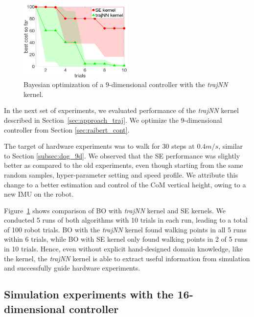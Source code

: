 \begin{figure}
    \centering
    \includegraphics[width = 0.5\textwidth]{img/9d_hdw_nn.png}
    \caption{Bayesian optimization of a 9-dimensional controller with the \textit{trajNN} kernel.}
    \label{fig:9d_hdw_nn}
\end{figure}
In the next set of experiments, we evaluated performance of the \textit{trajNN} kernel described in Section~\ref{sec:approach_traj}. We optimize the 9-dimensional controller from Section \ref{sec:raibert_cont}. 

The target of hardware experiments was to walk for 30 steps at $0.4m/s$, similar to Section \ref{subsec:dog_9d}. We observed that the SE performance was slightly better as compared to the old experiments, even though starting from the same random samples, hyper-parameter setting and speed profile. We attribute this change to a better estimation and control of the CoM vertical height, owing to a new IMU on the robot. 


Figure~\ref{fig:9d_hdw_nn} shows comparison of BO with \textit{trajNN} kernel and SE kernels. We conducted 5 runs of both algorithms with 10 trials in each run, leading to a total of 100 robot trials. BO with the \textit{trajNN} kernel found walking points in all 5 runs within 6 trials, while BO with SE kernel only found walking points in 2 of 5 runs in 10 trials.
Hence, even without explicit hand-designed domain knowledge, like the \dogkernel kernel, the \textit{trajNN} kernel is able to extract useful information from simulation and successfully guide hardware experiments.


\subsection{Simulation experiments with the 16-dimensional controller}
\label{experiments_nm}

